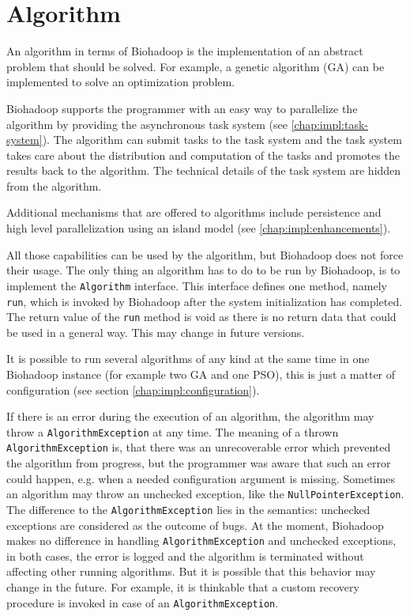 \section{Algorithm}
\label{chap:impl:algorithm}
An algorithm in terms of Biohadoop is the implementation of an abstract problem that should be solved. For example, a genetic algorithm (GA) can be implemented to solve an optimization problem.

Biohadoop supports the programmer with an easy way to parallelize the algorithm by providing the asynchronous task system (see \ref{chap:impl:task-system}). The algorithm can submit tasks to the task system and the task system takes care about the distribution and computation of the tasks and promotes the results back to the algorithm. The technical details of the task system are hidden from the algorithm.

Additional mechanisms that are offered to algorithms include persistence and high level parallelization using an island model (see \ref{chap:impl:enhancements}).

All those capabilities can be used by the algorithm, but Biohadoop does not force their usage. The only thing an algorithm has to do to be run by Biohadoop, is to implement the \texttt{Algorithm} interface. This interface defines one method, namely \texttt{run}, which is invoked by Biohadoop after the system initialization has completed. The return value of the \texttt{run} method is void as there is no return data that could be used in a general way. This may change in future versions.

It is possible to run several algorithms of any kind at the same time in one Biohadoop instance (for example two GA and one PSO), this is just a matter of configuration (see section \ref{chap:impl:configuration}).
   
If there is an error during the execution of an algorithm, the algorithm may throw a \texttt{AlgorithmException} at any time. The meaning of a thrown \texttt{AlgorithmException} is, that there was an unrecoverable error which prevented the algorithm from progress, but the programmer was aware that such an error could happen, e.g. when a needed configuration argument is missing. Sometimes an algorithm may throw an unchecked exception, like the \texttt{NullPointerException}. The difference to the \texttt{AlgorithmException} lies in the semantics: unchecked exceptions are considered as the outcome of bugs. At the moment, Biohadoop makes no difference in handling \texttt{AlgorithmException} and unchecked exceptions, in both cases, the error is logged and the algorithm is terminated without affecting other running algorithms. But it is possible that this behavior may change in the future. For example, it is thinkable that a custom recovery procedure is invoked in case of an \texttt{AlgorithmException}.

